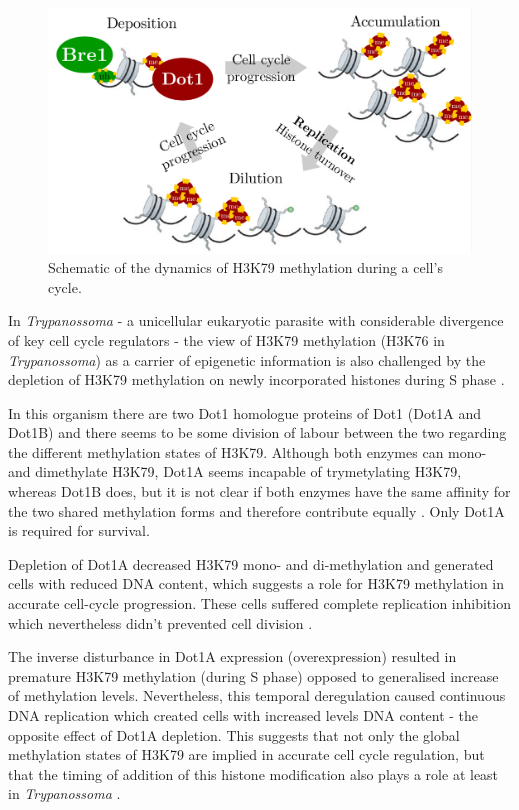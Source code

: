 \documentclass[11pt,twoside,a4paper]{report}
\begin{document}
		\begin{figure}[here]
			\centering
			\includegraphics[width=0.9\linewidth]{pngs/dot1_k79.png}
			\caption{Schematic of the dynamics of H3K79 methylation during a cell's cycle.}
			\label{fig:dot1_k79}
		\end{figure}
		
		In \textit{Trypanossoma} - a unicellular eukaryotic parasite with considerable divergence of key cell cycle regulators - the view of H3K79 methylation (H3K76 in \textit{Trypanossoma}) as a carrier of epigenetic information is also challenged by the depletion of H3K79 methylation on newly incorporated histones during S phase \cite{Gassen2012}.
		
		In this organism there are two Dot1 homologue proteins of Dot1 (Dot1A and Dot1B) and there seems to be some division of labour between the two regarding the different methylation states of H3K79. Although both enzymes can mono- and dimethylate H3K79, Dot1A seems incapable of trymetylating H3K79, whereas Dot1B does, but it is not clear if both enzymes have the same affinity for the two shared methylation forms and therefore contribute equally \cite{Gassen2012}. Only Dot1A is required for survival.
	
		Depletion of Dot1A decreased H3K79 mono- and di-methylation and generated cells with reduced DNA content, which suggests a role for H3K79 methylation in accurate cell-cycle progression. These cells suffered complete replication inhibition which nevertheless didn't prevented cell division \cite{Gassen2012}.
		
		The inverse disturbance in Dot1A expression (overexpression) resulted in premature H3K79 methylation (during S phase) opposed to generalised increase of methylation levels. Nevertheless, this temporal deregulation caused continuous DNA replication which created cells with increased levels DNA content - the opposite effect of Dot1A depletion. This suggests that not only the global methylation states of H3K79 are implied in accurate cell cycle regulation, but that the timing of addition of this histone modification also plays a role at least in \textit{Trypanossoma} \cite{Gassen2012}.
		
\end{document}
